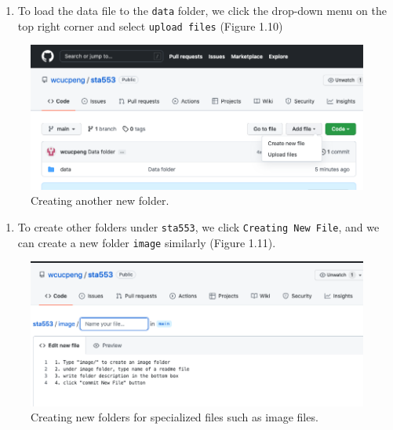 \documentclass[
]{book}
\providecommand{\tightlist}{%
  \setlength{\itemsep}{0pt}\setlength{\parskip}{0pt}}
\begin{document}
\begin{enumerate}
\def\labelenumi{\arabic{enumi}.}
\setcounter{enumi}{4}
\tightlist
\item
  To load the data file to the \texttt{data} folder, we click the drop-down menu on the top right corner and select \texttt{upload\ files} (Figure 1.10)
\end{enumerate}

\begin{figure}

{\centering \includegraphics[width=0.9\linewidth]{img00/CreateNextFolder} 

}

\caption{Creating another new folder.}\label{fig:unnamed-chunk-16}
\end{figure}

\begin{enumerate}
\def\labelenumi{\arabic{enumi}.}
\setcounter{enumi}{5}
\tightlist
\item
  To create other folders under \texttt{sta553}, we click \texttt{Creating\ New\ File}, and we can create a new folder \texttt{image} similarly (Figure 1.11).
\end{enumerate}

\begin{figure}

{\centering \includegraphics[width=0.9\linewidth]{img00/CreateNewImageFolder} 

}

\caption{Creating new folders for specialized files such as image files.}\label{fig:unnamed-chunk-17}
\end{figure}
\end{document}
